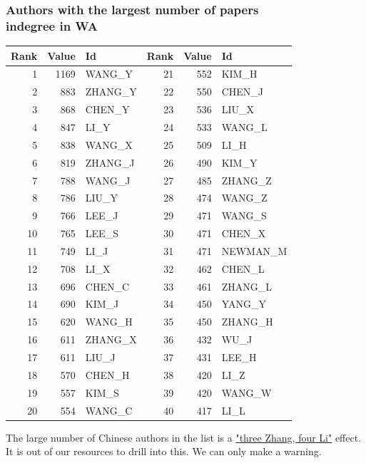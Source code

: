 \documentclass[hyperref={pdfstartview={FitBH -32768},
                         pdfpagemode=FullScreen,
                         plainpages=false,
                         colorlinks=true}
              ]{beamer}
\begin{document}
\begin{frame}[fragile]
\frametitle{Authors with the largest number of papers \label{numpap}\\ \normalsize indegree in WA}

\renewcommand{\arraystretch}{0.82}
\tiny
\begin{tabular}{r|r|l||r|r|l}
Rank& 	Value& 	Id& 	Rank& 	Value& 	Id\\  \hline   
1& 	1169& 	WANG\_Y& 	21& 	552& 	KIM\_H\\ 
2& 	883& 	ZHANG\_Y& 	22& 	550& 	CHEN\_J\\ 
3& 	868& 	CHEN\_Y& 	23& 	536& 	LIU\_X\\ 
4& 	847& 	LI\_Y& 	24& 	533& 	WANG\_L\\ 
5& 	838& 	WANG\_X& 	25& 	509& 	LI\_H\\ 
6& 	819& 	ZHANG\_J& 	26& 	490& 	KIM\_Y\\ 
7& 	788& 	WANG\_J& 	27& 	485& 	ZHANG\_Z\\ 
8& 	786& 	LIU\_Y& 	28& 	474& 	WANG\_Z\\ 
9& 	766& 	LEE\_J& 	29& 	471& 	WANG\_S\\ 
10& 	765& 	LEE\_S& 	30& 	471& 	CHEN\_X\\ 
11& 	749& 	LI\_J& 	31& 	471& 	NEWMAN\_M\\ 
12& 	708& 	LI\_X& 	32& 	462& 	CHEN\_L\\ 
13& 	696& 	CHEN\_C& 	33& 	461& 	ZHANG\_L\\ 
14& 	690& 	KIM\_J& 	34& 	450& 	YANG\_Y\\ 
15& 	620& 	WANG\_H& 	35& 	450& 	ZHANG\_H\\ 
16& 	611& 	ZHANG\_X& 	36& 	432& 	WU\_J\\ 
17& 	611& 	LIU\_J& 	37& 	431& 	LEE\_H\\ 
18& 	570& 	CHEN\_H& 	38& 	420& 	LI\_Z\\ 
19& 	557& 	KIM\_S& 	39& 	420& 	WANG\_W\\ 
20& 	554& 	WANG\_C& 	40& 	417& 	LI\_L\\ \hline  
\end{tabular}


\medskip

The large number of Chinese authors in the list is a \href{https://en.wikipedia.org/wiki/List_of_common_Chinese_surnames}{"three Zhang, four Li"} effect. It is out of our resources to drill into this. We can only make a warning.

\end{frame}
\end{document}
